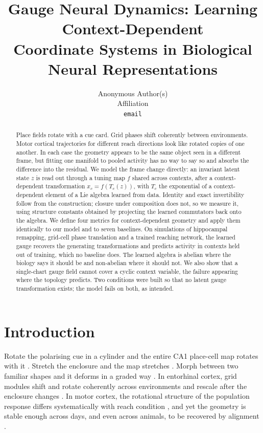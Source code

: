 \documentclass{article}
\title{Gauge Neural Dynamics: Learning Context-Dependent\\Coordinate Systems in
Biological Neural Representations}
\author{%
  Anonymous Author(s)\\
  Affiliation\\
  \texttt{email}
}
\theoremstyle{plain}
\begin{document}
\maketitle

\begin{abstract}
Place fields rotate with a cue card. Grid phases shift coherently between
environments. Motor cortical trajectories for different reach directions look
like rotated copies of one another. In each case the geometry appears to be
the same object seen in a different frame, but fitting one manifold to pooled
activity has no way to say so and absorbs the difference into the residual. We
model the frame change directly: an
invariant latent state $z$ is read out through a tuning map $f$ shared across
contexts, after a context-dependent transformation $x_c = f(T_c(z))$, with $T_c$
the exponential of a context-dependent element of a Lie algebra learned from
data. Identity and exact invertibility follow from the construction; closure
under composition does not, so we measure it, using structure constants obtained
by projecting the learned commutators back onto the algebra. We define four
metrics for context-dependent geometry and apply them identically to our model
and to seven baselines. On simulations of hippocampal remapping, grid-cell phase
translation and a trained reaching network, the learned gauge recovers the
generating transformations and predicts activity in contexts held out of
training, which no baseline does. The learned algebra is abelian where the
biology says it should be and non-abelian where it should not. We also show that
a single-chart gauge field cannot cover a cyclic context variable, the failure
appearing where the topology predicts. Two conditions were built so that no
latent gauge transformation exists; the model fails on both, as intended.
\end{abstract}

\section{Introduction}

Rotate the polarising cue in a cylinder and the entire CA1 place-cell map
rotates with it \citep{muller1987effects,bostock1991experience}. Stretch the
enclosure and the map stretches \citep{okeefe1996geometric}. Morph between two
familiar shapes and it deforms in a graded way
\citep{wills2005attractor,leutgeb2005independent}. In entorhinal cortex, grid
modules shift and rotate coherently across environments
\citep{fyhn2007hippocampal} and rescale after the enclosure changes
\citep{barry2007experience}. In motor cortex, the rotational structure of the
population response differs systematically with reach condition
\citep{churchland2012neural,vyas2020computation}, and yet the geometry is stable
enough across days, and even across animals, to be recovered by alignment
\citep{gallego2020longterm,degenhart2020stabilization,safaie2023preserved}.
\end{document}
